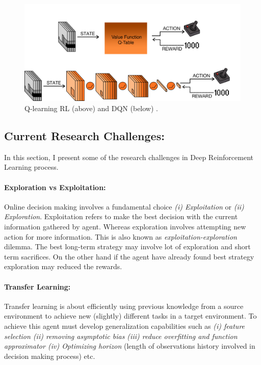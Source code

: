 \begin{figure}[t]
	\includegraphics[width=0.95\linewidth ]{fig/dqn.png}
    \vspace{-2mm}
    \caption{Q-learning RL (above) and DQN (below) \cite{mnih2015human}.}
    \label{fig:dqn}
\end{figure}

\subsection{Current Research Challenges:}
In this section, I present some of the research challenges in Deep Reinforcement Learning process.
\paragraph{Exploration vs Exploitation:}
Online decision making involves a fundamental choice {\em (i) Exploitation} or {\em (ii) Exploration}. Exploitation refers to make the best decision with the current information gathered by agent. Whereas exploration involves attempting new action for more information. This is also known as {\em exploitation-exploration} dilemma. The best long-term strategy may involve lot of exploration and short term sacrifices. On the other hand if the agent have already found best strategy exploration may reduced the rewards.

\paragraph{Transfer Learning:}
Transfer learning is about efficiently using previous knowledge from a
source environment to achieve new (slightly) different tasks in a target environment. To achieve this agent must develop generalization capabilities such as {\em (i) feature selection (ii) removing asymptotic bias (iii) reduce overfitting and function approximator (iv) Optimizing horizon} (length of observations history involved in decision making process) etc.

